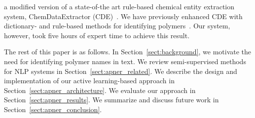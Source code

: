 a modified version of a state-of-the art rule-based chemical entity extraction
system, ChemDataExtractor (CDE)~\cite{swain2016chemdataextractor}.
We have previously enhanced CDE
with dictionary- and rule-based methods for identifying polymers~\cite{tchoua2017towards}.
Our system, however, took five hours of expert time to achieve this result.

The rest of this paper is as follows. 
In Section~\ref{sect:background}, we motivate the need for identifying polymer names in
text. 
We review semi-supervised methods for NLP systems in
Section~\ref{sect:apner_related}. 
We describe the design and implementation of our active learning-based approach in Section~\ref{sect:apner_architecture}. 
We evaluate our approach in Section~\ref{sect:apner_results}. We summarize and discuss future work in Section~\ref{sect:apner_conclusion}.





